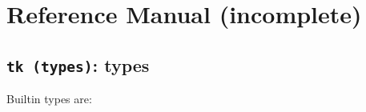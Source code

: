 \chapter{Reference Manual (incomplete)}
\label{chap:ref}





\section{{\tt tk (types)}: types}
Builtin types are:





